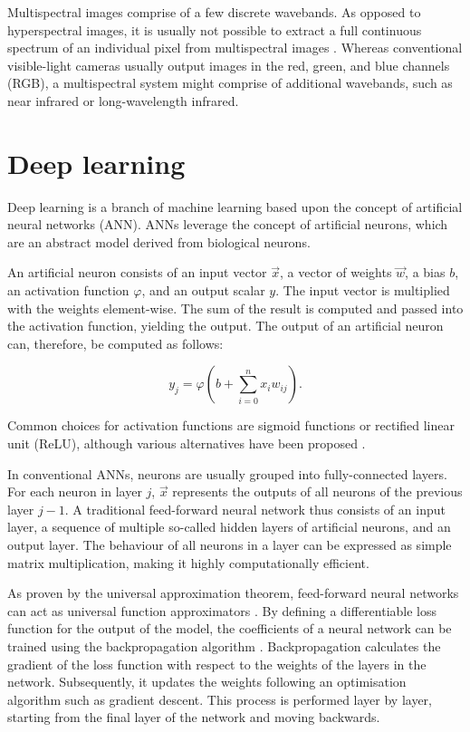 \documentclass{l4proj}
\begin{document}
Multispectral images comprise of a few discrete wavebands. As opposed to hyperspectral images, it is usually not possible to extract a full continuous spectrum of an individual pixel from multispectral images \citep{abdul_multi-disnet_2019}. Whereas conventional visible-light cameras usually output images in the red, green, and blue channels (RGB), a multispectral system might comprise of additional wavebands, such as near infrared or long-wavelength infrared.



\section{Deep learning}

Deep learning is a branch of machine learning based upon the concept of artificial neural networks (ANN). ANNs leverage the concept of artificial neurons, which are an abstract model derived from biological neurons. 

An artificial neuron consists of an input vector $\vec{x}$, a vector of weights $\vec{w}$, a bias $b$, an activation function $\varphi$, and an output scalar $y$. The input vector is multiplied with the weights element-wise. The sum of the result is computed and passed into the activation function, yielding the output. The output of an artificial neuron can, therefore, be computed as follows:

\begin{equation}
  y_j = \varphi (b + \sum_{i=0}^n x_i w_{ij}).
\end{equation}

Common choices for activation functions are sigmoid functions or rectified linear unit (ReLU), although various alternatives have been proposed \citep{ramachandran_searching_2017}.

In conventional ANNs, neurons are usually grouped into fully-connected layers. For each neuron in layer $j$, $\vec{x}$ represents the outputs of all neurons of the previous layer $j-1$. A traditional feed-forward neural network thus consists of an input layer, a sequence of multiple so-called hidden layers of artificial neurons, and an output layer. The behaviour of all neurons in a layer can be expressed as simple matrix multiplication, making it highly computationally efficient.

As proven by the universal approximation theorem, feed-forward neural networks can act as universal function approximators \citep{hornik_approximation_1991}. By defining a differentiable loss function for the output of the model, the coefficients of a neural network can be trained using the backpropagation algorithm \citep{rumelhart_learning_1986}. Backpropagation calculates the gradient of the loss function with respect to the weights of the layers in the network. Subsequently, it updates the weights following an optimisation algorithm such as gradient descent. This process is performed layer by layer, starting from the final layer of the network and moving backwards.
\end{document}

